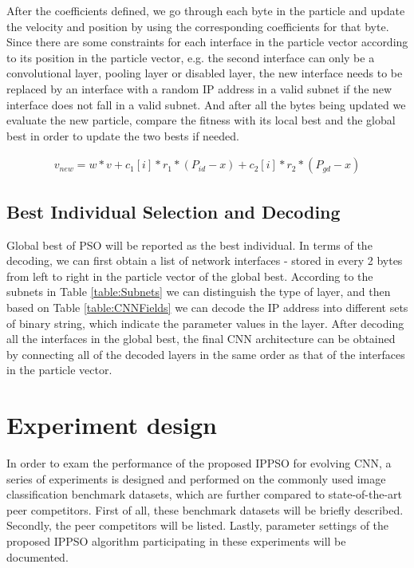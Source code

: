 \documentclass[conference]{IEEEtran}
\begin{document}
After the coefficients defined, we go through each byte in the particle and update the velocity and position by using the corresponding coefficients for that byte. Since there are some constraints for each interface in the particle vector according to its position in the particle vector, e.g. the second interface can only be a convolutional layer, pooling layer or disabled layer, the new interface needs to be replaced by an interface with a random IP address in a valid subnet if the new interface does not fall in a valid subnet. And after all the bytes being updated we evaluate the new particle, compare the fitness with its local best and the global best in order to update the two bests if needed.

\begin{equation}\label{eq:UpdateVNew}
\begin{aligned}
v_{new} = w * v + c_{1}[i] * r_{1} * (P_{id} - x) + c_{2}[i] * r_{2} * (P_{gd} - x)
\end{aligned}
\end{equation}


\subsection{Best Individual Selection and Decoding}

Global best of PSO will be reported as the best individual. In terms of the decoding, we can first obtain a list of network interfaces - stored in every 2 bytes from left to right in the particle vector of the global best. According to the subnets in Table \ref{table:Subnets} we can distinguish the type of layer, and then based on Table \ref{table:CNNFields} we can decode the IP address into different sets of binary string, which indicate the parameter values in the layer. After decoding all the interfaces in the global best, the final CNN architecture can be obtained by connecting all of the decoded layers in the same order as that of the interfaces in the particle vector.

\section{Experiment design}\label{sec:EPDesign}

In order to exam the performance of the proposed IPPSO for evolving CNN, a series of experiments is designed and performed on the commonly used image classification benchmark datasets, which are further compared to state-of-the-art peer competitors. First of all, these benchmark datasets will be briefly described. Secondly, the peer competitors will be listed. Lastly, parameter settings of the proposed IPPSO algorithm participating in these experiments will be documented.
\end{document}
